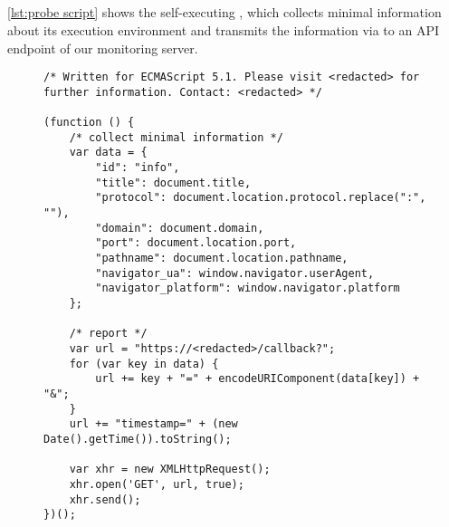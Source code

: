 \subsection{\Ourscriptname{}}\label{appendix:probing}
\autoref{lst:probe script} shows the self-executing \ourscriptname{}, which collects minimal information about its execution environment and transmits the information via  to an API endpoint of our monitoring server.
\vspace{1em}

\begin{figure}[htb]
\scriptsize
\begin{verbatim}
/* Written for ECMAScript 5.1. Please visit <redacted> for further information. Contact: <redacted> */

(function () { 
	/* collect minimal information */
	var data = {
		"id": "info",
		"title": document.title,
		"protocol": document.location.protocol.replace(":", ""),
		"domain": document.domain,
		"port": document.location.port,
		"pathname": document.location.pathname,
		"navigator_ua": window.navigator.userAgent,
		"navigator_platform": window.navigator.platform
	};

	/* report */
	var url = "https://<redacted>/callback?";	
	for (var key in data) {  
		url += key + "=" + encodeURIComponent(data[key]) + "&";
	}
	url += "timestamp=" + (new Date().getTime()).toString();

	var xhr = new XMLHttpRequest();
	xhr.open('GET', url, true);
	xhr.send();
})();
\end{verbatim}

\caption{\Ourscriptname{}}%
\label{lst:probe script}
\end{figure}

\vspace{-1em}
